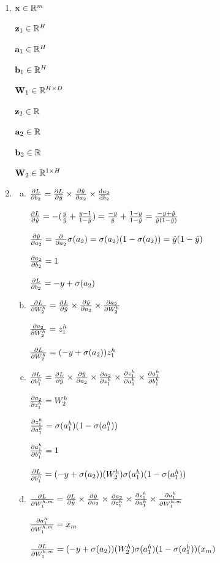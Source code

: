 \documentclass[submit]{harvardml}
\begin{document}
\begin{enumerate}
    \item 
    
    $\bold{x} \in \mathbb{R}^m $
    
    $\bold{z}_1 \in \mathbb{R}^H $
    
    $\bold{a}_1 \in \mathbb{R}^H $
    
    $\bold{b}_1 \in \mathbb{R}^H $
    
    $\bold{W}_1 \in \mathbb{R}^{H \times D} $
    
    $\bold{z}_2 \in \mathbb{R} $
    
    $\bold{a}_2 \in \mathbb{R} $
    
    $\bold{b}_2 \in \mathbb{R} $
    
    $\bold{W}_2 \in \mathbb{R}^{1 \times H} $
    
    \item 
    
\begin{enumerate}[(a)] %


    \item $\pdv{L}{b_2} = \pdv{L}{\hat{y}} \times \pdv{\hat{y}}{a_2} \times \dv{a_2}{b_2}$
    
    $\pdv{L}{\hat{y}} = -(\frac{y}{\hat{y}} + \frac{y-1}{1-\hat{y}}) = \frac{-y}{\hat{y}} + \frac{1-y}{1-\hat{y}} = \frac{-y + \hat{y}}{\hat{y}(1-\hat{y})}$
    
    $\pdv{\hat{y}}{a_2} = \pdv{}{a_2} \sigma(a_2) =  \sigma(a_2)(1 - \sigma(a_2)) =\hat{y}(1-\hat{y})$
    
    $\pdv{a_2}{b_2} = 1$
    
    $\pdv{L}{b_2} = -y + \sigma(a_2) $
    
    
    \item  $\pdv{L}{W_2^h} = \pdv{L}{\hat{y}} \times \pdv{\hat{y}}{a_2} \times \pdv{a_2}{W_2^h}$
    
    $\pdv{a_2}{W_2^h} = z_1^h$
    
    $\pdv{L}{W_2^h} = (-y + \sigma(a_2))z_1^h$
    
    
    \item $\pdv{L}{b_1^h} = \pdv{L}{\hat{y}} \times \pdv{\hat{y}}{a_2} \times \pdv{a_2}{z_1^h} \times \pdv{z_1^h}{a_1^h} \times \pdv{a_1^h}{b_1^h}$
    
    $\pdv{a_2}{z_1^h} = W_2^h$
    
    $\pdv{z_1^h}{a_1^h} = \sigma(a_1^h)(1-\sigma(a_1^h))$
    
    $\pdv{a_1^h}{b_1^h} = 1$
    
    $\pdv{L}{b_1^h} = (-y + \sigma(a_2))(W_2^h)\sigma(a_1^h)(1-\sigma(a_1^h))$
    
    \item $\pdv{L}{W_1^{h,m}} = \pdv{L}{\hat{y}} \times \pdv{\hat{y}}{a_2} \times \pdv{a_2}{z_1^h} \times \pdv{z_1^h}{a_1^h} \times \pdv{a_1^h}{W_1^{h,m}}$
    
    $\pdv{a_1^h}{W_1^{h,m}} = x_m$
    
    $\pdv{L}{W_1^{h,m}} = (-y + \sigma(a_2))(W_2^h)\sigma(a_1^h)(1-\sigma(a_1^h))(x_m)$
\end{enumerate}
    
\end{enumerate}
\end{document}
